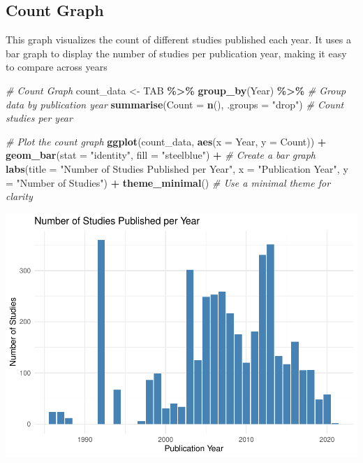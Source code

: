 \documentclass[
]{book}
\newenvironment{Shaded}{\begin{snugshade}}{\end{snugshade}}
\newcommand{\AttributeTok}[1]{\textcolor[rgb]{0.13,0.29,0.53}{#1}}
\newcommand{\CommentTok}[1]{\textcolor[rgb]{0.56,0.35,0.01}{\textit{#1}}}
\newcommand{\FunctionTok}[1]{\textcolor[rgb]{0.13,0.29,0.53}{\textbf{#1}}}
\newcommand{\NormalTok}[1]{#1}
\newcommand{\OtherTok}[1]{\textcolor[rgb]{0.56,0.35,0.01}{#1}}
\newcommand{\SpecialCharTok}[1]{\textcolor[rgb]{0.81,0.36,0.00}{\textbf{#1}}}
\newcommand{\StringTok}[1]{\textcolor[rgb]{0.31,0.60,0.02}{#1}}
\begin{document}
\subsection{Count Graph}\label{count-graph}

This graph visualizes the count of different studies published each year.
It uses a bar graph to display the number of studies per publication year, making it easy to compare across years

\begin{Shaded}
\begin{Highlighting}[]
\CommentTok{\# Count Graph}
\NormalTok{count\_data }\OtherTok{\textless{}{-}}\NormalTok{ TAB }\SpecialCharTok{\%\textgreater{}\%}
  \FunctionTok{group\_by}\NormalTok{(Year) }\SpecialCharTok{\%\textgreater{}\%}  \CommentTok{\# Group data by publication year}
  \FunctionTok{summarise}\NormalTok{(}\AttributeTok{Count =} \FunctionTok{n}\NormalTok{(), }\AttributeTok{.groups =} \StringTok{"drop"}\NormalTok{)  }\CommentTok{\# Count studies per year}

\CommentTok{\# Plot the count graph}
\FunctionTok{ggplot}\NormalTok{(count\_data, }\FunctionTok{aes}\NormalTok{(}\AttributeTok{x =}\NormalTok{ Year, }\AttributeTok{y =}\NormalTok{ Count)) }\SpecialCharTok{+}
  \FunctionTok{geom\_bar}\NormalTok{(}\AttributeTok{stat =} \StringTok{"identity"}\NormalTok{, }\AttributeTok{fill =} \StringTok{"steelblue"}\NormalTok{) }\SpecialCharTok{+}  \CommentTok{\# Create a bar graph}
  \FunctionTok{labs}\NormalTok{(}\AttributeTok{title =} \StringTok{"Number of Studies Published per Year"}\NormalTok{,}
       \AttributeTok{x =} \StringTok{"Publication Year"}\NormalTok{,}
       \AttributeTok{y =} \StringTok{"Number of Studies"}\NormalTok{) }\SpecialCharTok{+}
  \FunctionTok{theme\_minimal}\NormalTok{()  }\CommentTok{\# Use a minimal theme for clarity}
\end{Highlighting}
\end{Shaded}

\includegraphics{_main_files/figure-latex/unnamed-chunk-5-1.pdf}
\end{document}
